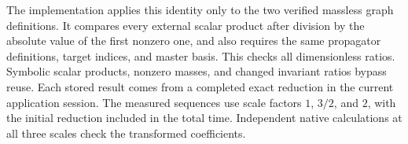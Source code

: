 The implementation applies this identity only to the two verified massless graph definitions. It compares every external scalar product after division by the absolute value of the first nonzero one, and also requires the same propagator definitions, target indices, and master basis. This checks all dimensionless ratios. Symbolic scalar products, nonzero masses, and changed invariant ratios bypass reuse. Each stored result comes from a completed exact reduction in the current application session. The measured sequences use scale factors $1$, $3/2$, and $2$, with the initial reduction included in the total time. Independent native calculations at all three scales check the transformed coefficients.
